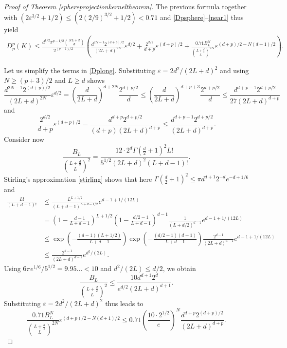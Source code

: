 \documentclass[11pt,a4paper]{article}
\theoremstyle{definition}
\begin{document}
\begin{proof}[Proof of Theorem \ref{sphereprojectionkerneltheorem}]
The previous formula together with $(2 \varepsilon^{3/2}+1/2) \le (2 (2/9)^{3/2}+1/2) < 0.71$ and \eqref{Dpsphere}--\eqref{near1} thus yield
\begin{equation}\label{Dplong}
\begin{split} D_p^p (K) \le \frac{d^{1/2} \pi^{p-1/2} \binom{NL+d}{d}}{2^{(p-1)/2}} \left( \frac{d^{2N-1} 2^{(d+p)/2}}{(2L+d)^{2N}} \varepsilon^{d/2} + \frac{2^{d/2}}{d+p} \varepsilon^{(d+p)/2} + \frac{0.71 B_L^N}{\binom{L+\frac{d}{2}}{L}^{2N}} \varepsilon^{(d+p)/2-N(d+1)/2} \right) . \end{split}
\end{equation}

Let us simplify the terms in \eqref{Dplong}. Substituting $\varepsilon=2d^2/(2L+d)^2$ and using $N \ge (p+3)/2$ and $L \ge d$ shows
\begin{equation}\label{Dpfirstterm}
\frac{d^{2N-1} 2^{(d+p)/2}}{(2L+d)^{2N}} \varepsilon^{d/2} = \left( \frac{d}{2L+d} \right)^{d+2N} \frac{2^{d+p/2}}{d} \le \left( \frac{d}{2L+d} \right)^{d+p+3} \frac{2^{d+p/2}}{d} \le \frac{d^{d+p-1}2^{d+p/2}}{27 (2L+d)^{d+p}}
\end{equation}
and
\begin{equation}\label{Dpsecondterm}
\frac{2^{d/2}}{d+p} \varepsilon^{(d+p)/2} = \frac{d^{d+p}2^{d+p/2}}{(d+p) (2L+d)^{d+p}} \le \frac{d^{d+p-1}2^{d+p/2}}{(2L+d)^{d+p}} .
\end{equation}
Consider now
\[ \frac{B_L}{\binom{L+\frac{d}{2}}{L}^2} = \frac{12 \cdot 2^d \Gamma \left( \frac{d}{2}+1 \right)^2 L!}{5^{1/2} (2L+d)^2 (L+d-1)!} . \]
Stirling's approximation \eqref{stirling} shows that here $\Gamma(\frac{d}{2} +1)^2 \le \pi d^{d+1} 2^{-d} e^{-d+1/6}$ and
\[ \begin{split} \frac{L!}{(L+d-1)!} &\le \frac{L^{L+1/2}}{(L+d-1)^{L+d-1/2}} e^{d-1+1/(12L)} \\ &= \left( 1-\frac{d-1}{L+d-1} \right)^{L+1/2} \left( 1-\frac{d/2-1}{L+d-1} \right)^{d-1} \frac{1}{(L+d/2)^{d-1}} e^{d-1+1/(12L)} \\ &\le \exp \left( - \frac{(d-1)(L+1/2)}{L+d-1} \right) \exp \left( - \frac{(d/2-1)(d-1)}{L+d-1} \right) \frac{2^{d-1}}{(2L+d)^{d-1}} e^{d-1+1/(12L)} \\ &\le \frac{2^{d-1}}{(2L+d)^{d-1}} e^{d^2/(2L)} . \end{split} \]
Using $6\pi e^{1/6}/5^{1/2}=9.95\ldots <10$ and $d^2/(2L) \le d/2$, we obtain
\[ \frac{B_L}{\binom{L+\frac{d}{2}}{L}^2} \le \frac{10 d^{d+1}2^d}{e^{d/2} (2L+d)^{d+1}} . \]
Substituting $\varepsilon=2d^2/(2L+d)^2$ thus leads to
\[ \frac{0.71 B_L^N}{\binom{L+\frac{d}{2}}{L}^{2N}} \varepsilon^{(d+p)/2-N(d+1)/2} \le 0.71 \left( \frac{10 \cdot 2^{1/2}}{e} \right)^N \frac{d^{d+p}2^{(d+p)/2}}{(2L+d)^{d+p}} . \]

\end{proof}
\end{document}
